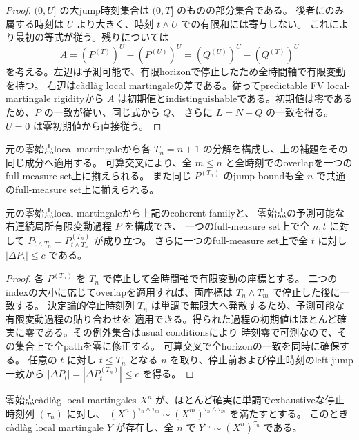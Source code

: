 \begin{proof}
$(0,U]$ の大jump時刻集合は $(0,T]$ のものの部分集合である。
後者にのみ属する時刻は $U$ より大きく、時刻 $t\wedge U$ での有限和には寄与しない。
これにより最初の等式が従う。残りについては
\[
 A=(P^{(T)})^U-(P^{(U)})^U
   =(Q^{(U)})^U-(Q^{(T)})^U
\]
を考える。左辺は予測可能で、有限horizonで停止したため全時間軸で有限変動を持つ。
右辺はc\`adl\`ag local martingaleの差である。従ってpredictable FV local-martingale rigidityから
$A$ は初期値とindistinguishableである。初期値は零であるため、$P$ の一致が従い、同じ式から $Q$、
さらに $L=N-Q$ の一致を得る。$U=0$ は零初期値から直接従う。
\end{proof}

元の零始点local martingaleから各 $T_n=n+1$ の分解を構成し、上の補題をその同じ成分へ適用する。
可算交叉により、全 $m\leq n$ と全時刻でのoverlapを一つのfull-measure set上に揃えられる。
また同じ $P^{(T_n)}$ のjump boundも全 $n$ で共通のfull-measure set上に揃えられる。

\begin{lemma}[予測可能成分の全時刻への貼り合わせ]
元の零始点local martingaleから上記のcoherent familyと、
零始点の予測可能な右連続局所有限変動過程 $P$ を構成でき、
一つのfull-measure set上で全 $n,t$ に対して
$P_{t\wedge T_n}=P^{(T_n)}_{t\wedge T_n}$ が成り立つ。
さらに一つのfull-measure set上で全 $t$ に対し $|\Delta P_t|\leq c$ である。
\end{lemma}

\begin{proof}
各 $P^{(T_n)}$ を $T_n$ で停止して全時間軸で有限変動の座標とする。
二つのindexの大小に応じてoverlapを適用すれば、両座標は $T_n\wedge T_m$ で停止した後に一致する。
決定論的停止時刻列 $T_n$ は単調で無限大へ発散するため、予測可能な有限変動過程の貼り合わせを
適用できる。得られた過程の初期値はほとんど確実に零である。その例外集合はusual conditionsにより
時刻零で可測なので、その集合上で全pathを零に修正する。
可算交叉で全horizonの一致を同時に確保する。
任意の $t$ に対し $t\leq T_n$ となる $n$ を取り、停止前および停止時刻のleft jump一致から
$|\Delta P_t|=|\Delta P^{(T_n)}_t|\leq c$ を得る。
\end{proof}

\begin{lemma}
零始点c\`adl\`ag local martingales $X^n$ が、ほとんど確実に単調でexhaustiveな停止時刻列 $(\tau_n)$ に対し、
$(X^n)^{\tau_n\wedge\tau_m}\sim(X^m)^{\tau_n\wedge\tau_m}$ を満たすとする。
このときc\`adl\`ag local martingale $Y$ が存在し、全 $n$ で
$Y^{\tau_n}\sim(X^n)^{\tau_n}$ である。
\end{lemma}

